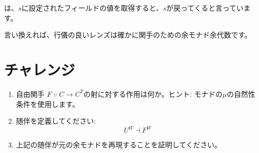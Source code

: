 は、$s$に設定されたフィールドの値を取得すると、$s$が戻ってくると言っています。

言い換えれば、行儀の良いレンズは確かに関手のための余モナド余代数です。

\section{チャレンジ}

\begin{enumerate}
  \tightlist
  \item
        自由関手
        $F \Colon C \to C^T$の射に対する作用は何か。ヒント: モナドの$\mu$の自然性条件を使用します。
  \item
        随伴を定義してください: 
        \[U^W \dashv F^W\]
  \item
        上記の随伴が元の余モナドを再現することを証明してください。
\end{enumerate}

